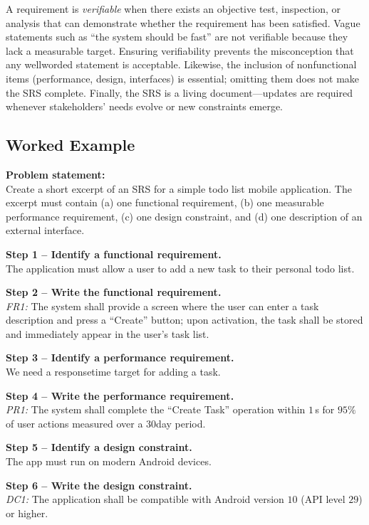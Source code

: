 \documentclass[12pt, a4paper]{article}
\begin{document}
A requirement is \emph{verifiable} when there exists an objective test, inspection, or analysis that can demonstrate whether the requirement has been satisfied.  Vague statements such as ``the system should be fast'' are not verifiable because they lack a measurable target.  Ensuring verifiability prevents the misconception that any wellworded statement is acceptable.  Likewise, the inclusion of nonfunctional items (performance, design, interfaces) is essential; omitting them does not make the SRS complete.  Finally, the SRS is a living document---updates are required whenever stakeholders' needs evolve or new constraints emerge.  

\subsection{Worked Example}
\textbf{Problem statement:}\\
Create a short excerpt of an SRS for a simple todo list mobile application.  The excerpt must contain (a) one functional requirement, (b) one measurable performance requirement, (c) one design constraint, and (d) one description of an external interface.

\textbf{Step 1 -- Identify a functional requirement.}\\
The application must allow a user to add a new task to their personal todo list.

\textbf{Step 2 -- Write the functional requirement.}\\
\textit{FR1:} The system shall provide a screen where the user can enter a task description and press a ``Create'' button; upon activation, the task shall be stored and immediately appear in the user's task list.

\textbf{Step 3 -- Identify a performance requirement.}\\
We need a responsetime target for adding a task.

\textbf{Step 4 -- Write the performance requirement.}\\
\textit{PR1:} The system shall complete the ``Create Task'' operation within $1\,$s for $95\%$ of user actions measured over a 30day period.

\textbf{Step 5 -- Identify a design constraint.}\\
The app must run on modern Android devices.

\textbf{Step 6 -- Write the design constraint.}\\
\textit{DC1:} The application shall be compatible with Android version $10$ (API level $29$) or higher.
\end{document}
